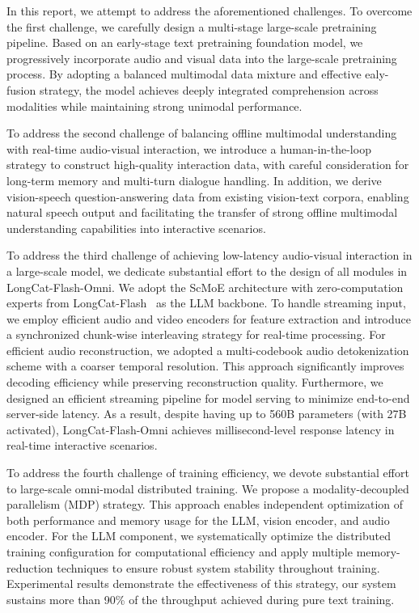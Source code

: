 \documentclass{article}
\newcommand{\longcat}{LongCat-Flash-Omni\xspace}
\begin{document}
In this report, we attempt to address the aforementioned challenges. 
To overcome the first challenge, we carefully design a multi-stage large-scale pretraining pipeline. Based on an early-stage text pretraining foundation model, we progressively incorporate audio and visual data into the large-scale pretraining process. By adopting a balanced multimodal data mixture and effective ealy-fusion strategy, the model achieves deeply integrated comprehension across modalities while maintaining strong unimodal performance. 

To address the second challenge of balancing offline multimodal understanding with real-time audio-visual interaction, we introduce a human-in-the-loop strategy to construct high-quality interaction data, with careful consideration for long-term memory and multi-turn dialogue handling. In addition, we derive vision-speech question-answering data from existing vision-text corpora, enabling natural speech output and facilitating the transfer of strong offline multimodal understanding capabilities into interactive scenarios.

To address the third challenge of achieving low-latency audio-visual interaction in a large-scale model, we dedicate substantial effort to the design of all modules in \longcat.
We adopt the ScMoE architecture with zero-computation experts from LongCat-Flash~\citep{meituan2025longcat_flash_chat,meituan2025longcat_flash_chat_thinking} as the LLM backbone. To handle streaming input, we employ efficient audio and video encoders for feature extraction and introduce a synchronized chunk-wise interleaving strategy for real-time processing. For efficient audio reconstruction, we adopted a multi-codebook audio detokenization scheme with a coarser temporal resolution. This approach significantly improves decoding efficiency while preserving reconstruction quality.
Furthermore, we designed an efficient streaming pipeline for model serving to minimize end-to-end server-side latency. As a result, despite having up to 560B parameters (with 27B activated), \longcat achieves millisecond-level response latency in real-time interactive scenarios.

To address the fourth challenge of training efficiency, we devote substantial effort to large-scale omni-modal distributed training. We propose a modality-decoupled parallelism (MDP) strategy. This approach enables independent optimization of both performance and memory usage for the LLM, vision encoder, and audio encoder. For the LLM component, we systematically optimize the distributed training configuration for computational efficiency and apply multiple memory-reduction techniques to ensure robust system stability throughout training. Experimental results demonstrate the effectiveness of this strategy, our system sustains more than 90\% of the throughput achieved during pure text training.
\end{document}

